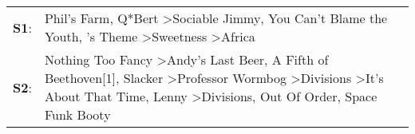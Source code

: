 \begin{supertabular}{p{0.03\textwidth}p{0.92\textwidth}}
 \textbf{S1}:  &                                                                                                                                                                                                                    Phil's Farm\textsuperscript{}, \enspace Q*Bert\textsuperscript{} \textgreater \enspace Sociable Jimmy\textsuperscript{}, \enspace You Can't Blame the Youth\textsuperscript{}, 's Theme\textsuperscript{} \textgreater \enspace Sweetness\textsuperscript{} \textgreater \enspace Africa\textsuperscript{}  \enspace  \\
 \textbf{S2}:  &  Nothing Too Fancy\textsuperscript{} \textgreater \enspace Andy's Last Beer\textsuperscript{}, \enspace A Fifth of Beethoven[1]\textsuperscript{}, \enspace Slacker\textsuperscript{} \textgreater \enspace Professor Wormbog\textsuperscript{} \textgreater \enspace Divisions\textsuperscript{} \textgreater \enspace It's About That Time\textsuperscript{}, \enspace Lenny\textsuperscript{} \textgreater \enspace Divisions\textsuperscript{}, \enspace Out Of Order\textsuperscript{}, \enspace Space Funk Booty\textsuperscript{}  \enspace  \\
\end{supertabular}
